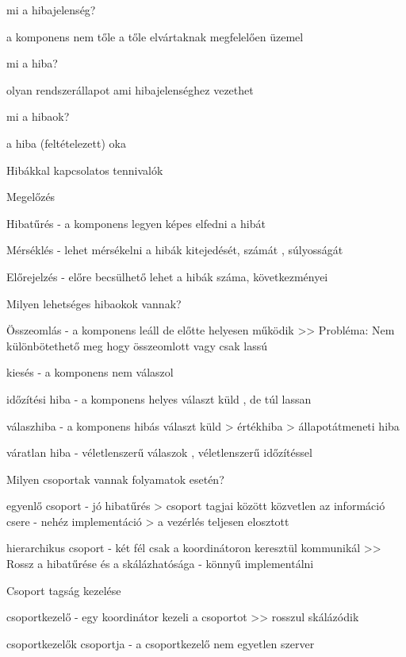\documentclass[12pt]{article}
\begin{document}
\begin{description}
    \item  mi a hibajelenség?
    \item a komponens nem tőle a tőle elvártaknak megfelelően üzemel
    \item  mi a hiba?
    \item olyan rendszerállapot ami hibajelenséghez vezethet
    \item  mi a hibaok?
    \item a hiba (feltételezett) oka
    \item  Hibákkal kapcsolatos tennivalók
    \item Megelőzés
    \item Hibatűrés
        - a komponens legyen képes elfedni a hibát
    \item Mérséklés
        - lehet mérsékelni a hibák kitejedését, számát , súlyosságát
    \item Előrejelzés
        - előre becsülhető lehet a hibák száma, következményei
    \item  Milyen lehetséges hibaokok vannak?
    \item Összeomlás
        - a komponens leáll de előtte helyesen működik
        >> Probléma: Nem különbötethető meg hogy összeomlott vagy csak lassú 
    \item kiesés
        - a komponens nem válaszol
    \item időzítési hiba
        - a komponens helyes választ küld , de túl lassan
    \item válaszhiba
        - a komponens hibás választ küld
        > értékhiba
        > állapotátmeneti hiba
    \item váratlan hiba
        - véletlenszerű válaszok , véletlenszerű időzítéssel
    \item  Milyen csoportak vannak folyamatok esetén?
    \item egyenlő csoport
        - jó hibatűrés
        > csoport tagjai között közvetlen az információ csere
        - nehéz implementáció
        > a vezérlés teljesen elosztott
    \item hierarchikus csoport
        - két fél csak a koordinátoron keresztül kommunikál
        >> Rossz a hibatűrése és a skálázhatósága
        - könnyű implementálni
    \item  Csoport tagság kezelése
    \item csoportkezelő
        - egy koordinátor kezeli a csoportot
        >> rosszul skálázódik
    \item csoportkezelők csoportja
        - a csoportkezelő nem egyetlen szerver

\end{description}
\end{document}

